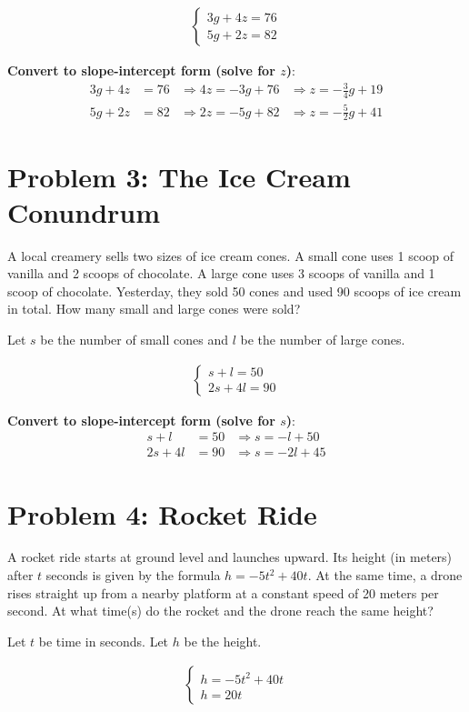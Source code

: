 \documentclass[12pt]{article}
\begin{document}
\begin{align*}
\left\{
  \begin{array}{l}
    3g + 4z = 76 \\ 
    5g + 2z = 82
  \end{array}
\right.
\end{align*}

\vspace{1em}
\noindent\textbf{Convert to slope-intercept form (solve for \( z \))}:
\begin{align*}
3g + 4z &= 76 & \Rightarrow 4z = -3g + 76 &\Rightarrow z = -\frac{3}{4}g + 19 \\ 
5g + 2z &= 82 & \Rightarrow 2z = -5g + 82 &\Rightarrow z = -\frac{5}{2}g + 41
\end{align*}

\newpage

\section*{Problem 3: The Ice Cream Conundrum}
A local creamery sells two sizes of ice cream cones. A small cone uses 1 scoop of vanilla and 2 scoops of chocolate. A large cone uses 3 scoops of vanilla and 1 scoop of chocolate. Yesterday, they sold 50 cones and used 90 scoops of ice cream in total. How many small and large cones were sold?

\vspace{1em}
\noindent Let \( s \) be the number of small cones and \( l \) be the number of large cones.

\begin{align*}
\left\{
  \begin{array}{l}
    s + l = 50 \\ 
    2s + 4l = 90
  \end{array}
\right.
\end{align*}

\vspace{1em}
\noindent\textbf{Convert to slope-intercept form (solve for \( s \))}:
\begin{align*}
s + l &= 50 & \Rightarrow s = -l + 50 \\ 
2s + 4l &= 90 & \Rightarrow s = -2l + 45
\end{align*}

\newpage

\section*{Problem 4: Rocket Ride}
A rocket ride starts at ground level and launches upward. Its height (in meters) after \( t \) seconds is given by the formula \( h = -5t^2 + 40t \). At the same time, a drone rises straight up from a nearby platform at a constant speed of 20 meters per second. At what time(s) do the rocket and the drone reach the same height?

\vspace{1em}
\noindent Let \( t \) be time in seconds. Let \( h \) be the height.

\begin{align*}
\left\{
  \begin{array}{l}
    h = -5t^2 + 40t \\ 
    h = 20t
  \end{array}
\right.
\end{align*}
\end{document}
